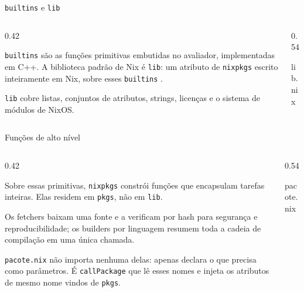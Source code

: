 \documentclass{beamer}
\newcommand{\termo}[1]{\alert{#1}}
\newcommand{\code}[1]{\texttt{#1}}
\newlength{\nixcodelift}\setlength{\nixcodelift}{7pt}
\newcommand{\nixcode}[2]{\vspace*{-\nixcodelift}\begin{nixbox}{#2}\end{nixbox}}
\begin{document}
\begin{frame}{\code{builtins} e \code{lib}}
	\begin{columns}[T,onlytextwidth]
		\begin{column}{0.42\textwidth}
			\small\raggedright
			\code{builtins} são as funções primitivas embutidas no avaliador, implementadas em C++. A biblioteca padrão de Nix é \code{lib}: um atributo de \code{nixpkgs} escrito inteiramente em Nix, sobre esses \code{builtins} \cite{nixpkgs-manual}.

			\medskip

			\code{lib} cobre listas, conjuntos de atributos, strings, licenças e o sistema de módulos de NixOS.
		\end{column}
		\begin{column}{0.54\textwidth}
			\nixcode{code/lib}{lib.nix}
		\end{column}
	\end{columns}
\end{frame}

\begin{frame}{Funções de alto nível}
	\begin{columns}[T,onlytextwidth]
		\begin{column}{0.42\textwidth}
			\small\raggedright
			Sobre essas primitivas, \code{nixpkgs} constrói funções que encapsulam tarefas inteiras. Elas residem em \code{pkgs}, não em \code{lib}.

			\smallskip

			Os \termo{fetchers} baixam uma fonte e a verificam por hash para segurança e reproducibilidade; os \termo{builders} por linguagem resumem toda a cadeia de compilação em uma única chamada.

			\smallskip

			\code{pacote.nix} não importa nenhuma delas: apenas declara o que precisa como parâmetros. É \code{callPackage} que lê esses nomes e injeta os atributos de mesmo nome vindos de \code{pkgs}.
		\end{column}
		\begin{column}{0.54\textwidth}
			\nixcode{code/pacote}{pacote.nix}
		\end{column}
	\end{columns}
\end{frame}
\end{document}
